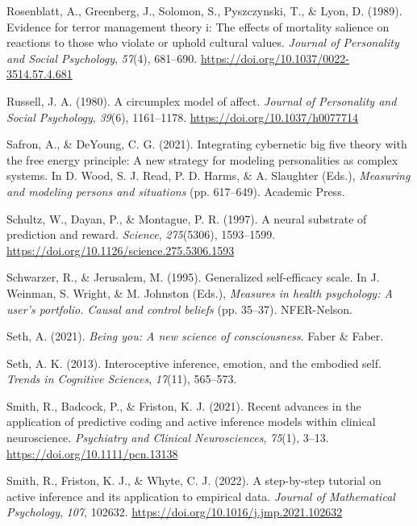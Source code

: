 \documentclass[
  jou,
  floatsintext,
  longtable,
  nolmodern,
  notxfonts,
  notimes,
  12pt,
  colorlinks=true,linkcolor=blue,citecolor=blue,urlcolor=blue]{apa7}
\newlength{\cslhangindent}
\newenvironment{CSLReferences}[2] %
 {\begin{list}{}{%
  \setlength{\itemindent}{0pt}
  \setlength{\leftmargin}{0pt}
  \setlength{\parsep}{0pt}
  \ifodd #1
   \setlength{\leftmargin}{\cslhangindent}
   \setlength{\itemindent}{-1\cslhangindent}
  \fi
  \setlength{\itemsep}{#2\baselineskip}}}
 {\end{list}}
\begin{document}
\begin{CSLReferences}{1}{0}
Rosenblatt, A., Greenberg, J., Solomon, S., Pyszczynski, T., \& Lyon, D.
(1989). Evidence for terror management theory i: The effects of
mortality salience on reactions to those who violate or uphold cultural
values. \emph{Journal of Personality and Social Psychology},
\emph{57}(4), 681--690. \url{https://doi.org/10.1037/0022-3514.57.4.681}

Russell, J. A. (1980). A circumplex model of affect. \emph{Journal of
Personality and Social Psychology}, \emph{39}(6), 1161--1178.
\url{https://doi.org/10.1037/h0077714}

Safron, A., \& DeYoung, C. G. (2021). Integrating cybernetic big five
theory with the free energy principle: A new strategy for modeling
personalities as complex systems. In D. Wood, S. J. Read, P. D. Harms,
\& A. Slaughter (Eds.), \emph{Measuring and modeling persons and
situations} (pp. 617--649). Academic Press.

Schultz, W., Dayan, P., \& Montague, P. R. (1997). A neural substrate of
prediction and reward. \emph{Science}, \emph{275}(5306), 1593--1599.
\url{https://doi.org/10.1126/science.275.5306.1593}

Schwarzer, R., \& Jerusalem, M. (1995). Generalized self-efficacy scale.
In J. Weinman, S. Wright, \& M. Johnston (Eds.), \emph{Measures in
health psychology: A user's portfolio. Causal and control beliefs} (pp.
35--37). NFER-Nelson.

Seth, A. (2021). \emph{Being you: A new science of consciousness}. Faber
\& Faber.

Seth, A. K. (2013). Interoceptive inference, emotion, and the embodied
self. \emph{Trends in Cognitive Sciences}, \emph{17}(11), 565--573.

Smith, R., Badcock, P., \& Friston, K. J. (2021). Recent advances in the
application of predictive coding and active inference models within
clinical neuroscience. \emph{Psychiatry and Clinical Neurosciences},
\emph{75}(1), 3--13. \url{https://doi.org/10.1111/pcn.13138}

Smith, R., Friston, K. J., \& Whyte, C. J. (2022). A step-by-step
tutorial on active inference and its application to empirical data.
\emph{Journal of Mathematical Psychology}, \emph{107}, 102632.
\url{https://doi.org/10.1016/j.jmp.2021.102632}


\end{CSLReferences}
\end{document}
